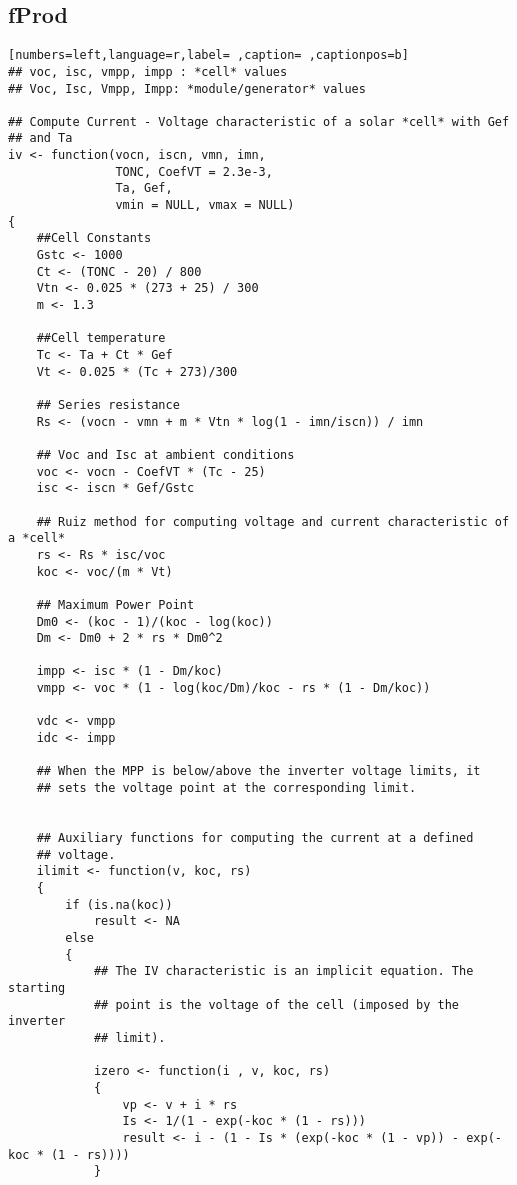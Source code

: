 \subsection{fProd}
\label{sec:org898e884}
\begin{lstlisting}[numbers=left,language=r,label= ,caption= ,captionpos=b]
## voc, isc, vmpp, impp : *cell* values
## Voc, Isc, Vmpp, Impp: *module/generator* values

## Compute Current - Voltage characteristic of a solar *cell* with Gef
## and Ta
iv <- function(vocn, iscn, vmn, imn,
               TONC, CoefVT = 2.3e-3,
               Ta, Gef,
               vmin = NULL, vmax = NULL)
{
    ##Cell Constants
    Gstc <- 1000
    Ct <- (TONC - 20) / 800
    Vtn <- 0.025 * (273 + 25) / 300
    m <- 1.3

    ##Cell temperature
    Tc <- Ta + Ct * Gef
    Vt <- 0.025 * (Tc + 273)/300

    ## Series resistance
    Rs <- (vocn - vmn + m * Vtn * log(1 - imn/iscn)) / imn

    ## Voc and Isc at ambient conditions
    voc <- vocn - CoefVT * (Tc - 25)
    isc <- iscn * Gef/Gstc

    ## Ruiz method for computing voltage and current characteristic of a *cell*
    rs <- Rs * isc/voc
    koc <- voc/(m * Vt)

    ## Maximum Power Point
    Dm0 <- (koc - 1)/(koc - log(koc))
    Dm <- Dm0 + 2 * rs * Dm0^2

    impp <- isc * (1 - Dm/koc)
    vmpp <- voc * (1 - log(koc/Dm)/koc - rs * (1 - Dm/koc))

    vdc <- vmpp
    idc <- impp

    ## When the MPP is below/above the inverter voltage limits, it
    ## sets the voltage point at the corresponding limit.


    ## Auxiliary functions for computing the current at a defined
    ## voltage.
    ilimit <- function(v, koc, rs) 
    {
        if (is.na(koc)) 
            result <- NA
        else
        {
            ## The IV characteristic is an implicit equation. The starting
            ## point is the voltage of the cell (imposed by the inverter
            ## limit). 

            izero <- function(i , v, koc, rs)
            {
                vp <- v + i * rs
                Is <- 1/(1 - exp(-koc * (1 - rs)))
                result <- i - (1 - Is * (exp(-koc * (1 - vp)) - exp(-koc * (1 - rs))))
            }


\end{lstlisting}
